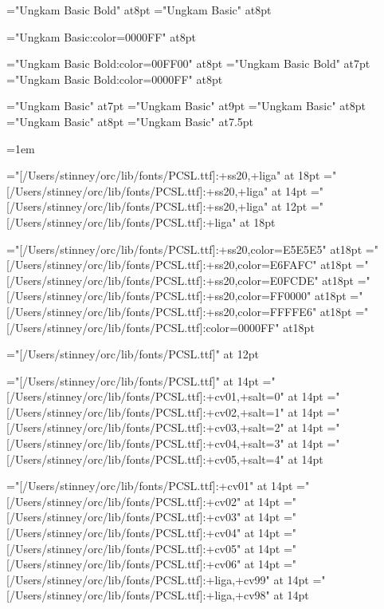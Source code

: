 

\font\slnmfont="Ungkam Basic Bold" at8pt
\font\sltgfont="Ungkam Basic" at8pt


\font\blungkam="Ungkam Basic:color=0000FF" at8pt

\font\slnmfontw="Ungkam Basic Bold:color=00FF00" at8pt
\font\slnmfontx="Ungkam Basic Bold" at7pt
\font\slnmfonty="Ungkam Basic Bold:color=0000FF" at8pt

\font\akafont="Ungkam Basic" at7pt
\font\sldistfont="Ungkam Basic" at9pt
\font\oidfont="Ungkam Basic" at8pt
\font\oidfontx="Ungkam Basic" at8pt
\font\zatufont="Ungkam Basic" at7.5pt

\oidfont{}=1em \showthe{}

\font\pcssXX="[/Users/stinney/orc/lib/fonts/PCSL.ttf]:+ss20,+liga" at 18pt
\font\pcssxx="[/Users/stinney/orc/lib/fonts/PCSL.ttf]:+ss20,+liga" at 14pt
\font\pcssxxx="[/Users/stinney/orc/lib/fonts/PCSL.ttf]:+ss20,+liga" at 12pt
\font\pcxviii="[/Users/stinney/orc/lib/fonts/PCSL.ttf]:+liga" at 18pt

\font\pceee="[/Users/stinney/orc/lib/fonts/PCSL.ttf]:+ss20,color=E5E5E5" at18pt
\font\pceff="[/Users/stinney/orc/lib/fonts/PCSL.ttf]:+ss20,color=E6FAFC" at18pt
\font\pcefd="[/Users/stinney/orc/lib/fonts/PCSL.ttf]:+ss20,color=E0FCDE" at18pt
\font\pcfee="[/Users/stinney/orc/lib/fonts/PCSL.ttf]:+ss20,color=FF0000" at18pt
\font\pcffe="[/Users/stinney/orc/lib/fonts/PCSL.ttf]:+ss20,color=FFFFE6" at18pt
\font\pcblu="[/Users/stinney/orc/lib/fonts/PCSL.ttf]:color=0000FF" at18pt

\font\pcringop="[/Users/stinney/orc/lib/fonts/PCSL.ttf]" at 12pt

\font\pcseq="[/Users/stinney/orc/lib/fonts/PCSL.ttf]" at 14pt
\font\pcseqi="[/Users/stinney/orc/lib/fonts/PCSL.ttf]:+cv01,+salt=0" at 14pt
\font\pcseqii="[/Users/stinney/orc/lib/fonts/PCSL.ttf]:+cv02,+salt=1" at 14pt
\font\pcseqiii="[/Users/stinney/orc/lib/fonts/PCSL.ttf]:+cv03,+salt=2" at 14pt
\font\pcseqiv="[/Users/stinney/orc/lib/fonts/PCSL.ttf]:+cv04,+salt=3" at 14pt
\font\pcseqv="[/Users/stinney/orc/lib/fonts/PCSL.ttf]:+cv05,+salt=4" at 14pt

\font\pccvi="[/Users/stinney/orc/lib/fonts/PCSL.ttf]:+cv01" at 14pt
\font\pccvii="[/Users/stinney/orc/lib/fonts/PCSL.ttf]:+cv02" at 14pt
\font\pccviii="[/Users/stinney/orc/lib/fonts/PCSL.ttf]:+cv03" at 14pt
\font\pccviv="[/Users/stinney/orc/lib/fonts/PCSL.ttf]:+cv04" at 14pt
\font\pccvv="[/Users/stinney/orc/lib/fonts/PCSL.ttf]:+cv05" at 14pt
\font\pccvvi="[/Users/stinney/orc/lib/fonts/PCSL.ttf]:+cv06" at 14pt
\font\pccvxcix="[/Users/stinney/orc/lib/fonts/PCSL.ttf]:+liga,+cv99" at 14pt
\font\pccvxcviii="[/Users/stinney/orc/lib/fonts/PCSL.ttf]:+liga,+cv98" at 14pt

